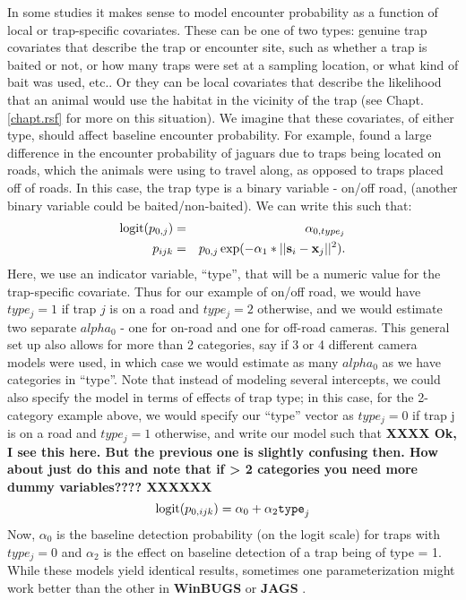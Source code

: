 In some studies it makes sense to model encounter probability as a
function of local or trap-specific covariates. These can be one of two
types: genuine trap covariates that describe the trap or encounter site,
such as whether a trap is baited or not, or how many traps were set at a sampling location,
or what kind of bait was used, etc.. Or they can be local covariates that
describe the likelihood that an animal would use the habitat in the
vicinity of the trap (see Chapt. \ref{chapt.rsf} for more on this situation).
We imagine that these covariates, of either type, should affect
baseline encounter probability.
For example, \citet{sollmann_etal:2011}
found a large difference in the encounter probability of jaguars due to traps
being located on roads, which the animals were using to travel along, as
opposed to traps placed off of roads.  In this case, the trap
type is a binary variable - on/off road,
(another binary variable could be baited/non-baited).  We can write this such that:
\begin{eqnarray*}
\mbox{logit}(p_{0,j}) &= &\alpha_{0,type_j}  \\
p_{ijk}  & = & p_{0,j} \exp(- \alpha_1*||{\bf s}_{i}-{\bf x}_{j}||^2).
\end{eqnarray*}
Here, we use an indicator variable, ``type'', that will be a numeric
value for the trap-specific covariate. 
Thus for our example of on/off
road, we would have $type_j = 1$ if trap $j$ is on a road and $type_j =
2$ otherwise, and we would estimate two separate $alpha_{0}$ - one for
on-road and one for off-road cameras.  This general set up also allows
for more than 2 categories, say if 3 or 4 different camera models were
used, in which case we would estimate as many $alpha_{0}$ as we have
categories in ``type''. Note that instead of modeling several
intercepts, we could also specify the model in terms of effects of
trap type; in this case, for the 2-category example above, we would
specify our ``type'' vector as $type_j = 0$ if trap j is on a road and
$type_j = 1$ otherwise, and write our model such that  {\bf XXXX Ok, I
  see this here. But the previous one is slightly confusing then.  How
  about just do this and note that if > 2 categories you need more
  dummy variables???? XXXXXX}
\[
\mbox{logit}(p_{0,ijk}) = \alpha_{0} + \alpha_{2} \mbox{\tt type}_{j}
\]
Now, $\alpha_{0}$ is the baseline detection probability (on the logit
scale) for traps with $type_j = 0$ and $\alpha_{2}$ is the effect on
baseline detection of a trap being of type = 1. While these models
yield identical results, sometimes one parameterization might work
better than the other in {\bf WinBUGS} or {\bf JAGS}
\citep{kery:2010}.
 
